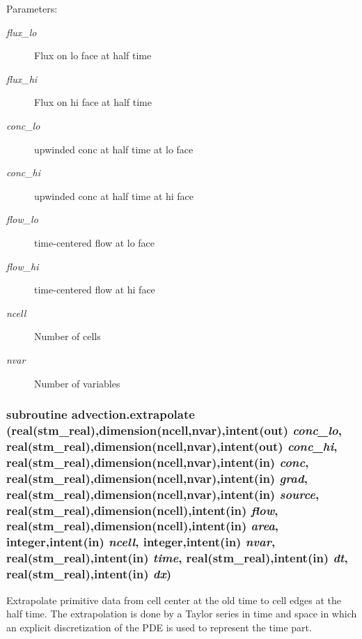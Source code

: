 \begin{Desc}
\item[Parameters:]
\begin{description}
\item[{\em flux\_\-lo}]Flux on lo face at half time\item[{\em flux\_\-hi}]Flux on hi face at half time\item[{\em conc\_\-lo}]upwinded conc at half time at lo face\item[{\em conc\_\-hi}]upwinded conc at half time at hi face\item[{\em flow\_\-lo}]time-centered flow at lo face\item[{\em flow\_\-hi}]time-centered flow at hi face\item[{\em ncell}]Number of cells\item[{\em nvar}]Number of variables \end{description}
\end{Desc}
\hypertarget{a00049_36ba824cb5dc6ca6127866376d2e79ec}{
\subsubsection[{extrapolate}]{\setlength{\rightskip}{0pt plus 5cm}subroutine advection.extrapolate (real(stm\_\-real),dimension(ncell,nvar),intent(out) {\em conc\_\-lo}, \/  real(stm\_\-real),dimension(ncell,nvar),intent(out) {\em conc\_\-hi}, \/  real(stm\_\-real),dimension(ncell,nvar),intent(in) {\em conc}, \/  real(stm\_\-real),dimension(ncell,nvar),intent(in) {\em grad}, \/  real(stm\_\-real),dimension(ncell,nvar),intent(in) {\em source}, \/  real(stm\_\-real),dimension(ncell),intent(in) {\em flow}, \/  real(stm\_\-real),dimension(ncell),intent(in) {\em area}, \/  integer,intent(in) {\em ncell}, \/  integer,intent(in) {\em nvar}, \/  real(stm\_\-real),intent(in) {\em time}, \/  real(stm\_\-real),intent(in) {\em dt}, \/  real(stm\_\-real),intent(in) {\em dx})}}
\label{a00049_36ba824cb5dc6ca6127866376d2e79ec}


Extrapolate primitive data from cell center at the old time to cell edges at the half time. The extrapolation is done by a Taylor series in time and space in which an explicit discretization of the PDE is used to represent the time part. 

